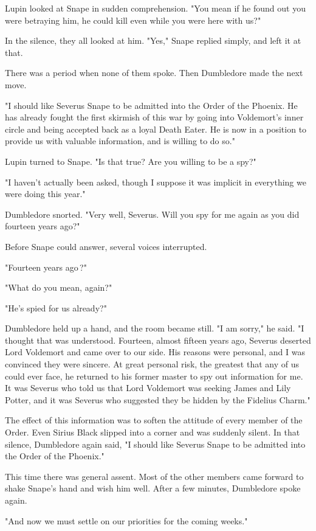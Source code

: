 Lupin looked at Snape in sudden comprehension. "You mean if he found out you were betraying him, he could kill even while you were here with us?"

In the silence, they all looked at him. "Yes," Snape replied simply, and left it at that.

There was a period when none of them spoke. Then Dumbledore made the next move.

"I should like Severus Snape to be admitted into the Order of the Phoenix. He has already fought the first skirmish of this war by going into Voldemort's inner circle and being accepted back as a loyal Death Eater. He is now in a position to provide us with valuable information, and is willing to do so."

Lupin turned to Snape. "Is that true? Are you willing to be a spy?"

"I haven't actually been asked, though I suppose it was implicit in everything we were doing this year."

Dumbledore snorted. "Very well, Severus. Will you spy for me again as you did fourteen years ago?"

Before Snape could answer, several voices interrupted.

"Fourteen years ago{\el}\,?"

"What do you mean, again?"

"He's spied for us already?"

Dumbledore held up a hand, and the room became still. "I am sorry," he said. "I thought that was understood. Fourteen, almost fifteen years ago, Severus deserted Lord Voldemort and came over to our side. His reasons were personal, and I was convinced they were sincere. At great personal risk, the greatest that any of us could ever face, he returned to his former master to spy out information for me. It was Severus who told us that Lord Voldemort was seeking James and Lily Potter, and it was Severus who suggested they be hidden by the Fidelius Charm."

The effect of this information was to soften the attitude of every member of the Order. Even Sirius Black slipped into a corner and was suddenly silent. In that silence, Dumbledore again said, "I should like Severus Snape to be admitted into the Order of the Phoenix."

This time there was general assent. Most of the other members came forward to shake Snape's hand and wish him well. After a few minutes, Dumbledore spoke again.

"And now we must settle on our priorities for the coming weeks."

